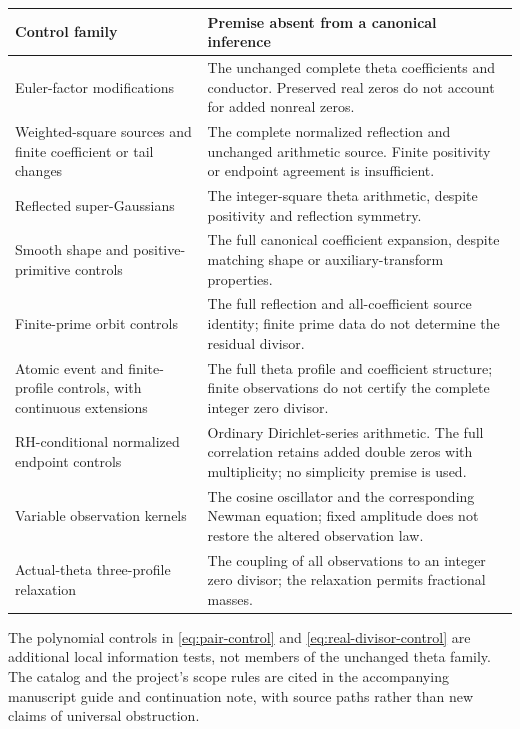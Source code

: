 \begin{center}\small
\begin{tabularx}{\textwidth}{@{}>{\raggedright\arraybackslash}p{}Y@{}}
\toprule
Control family & Premise absent from a canonical inference\\
\midrule
Euler-factor modifications &
The unchanged complete theta coefficients and conductor. Preserved
real zeros do not account for added nonreal zeros.\\
Weighted-square sources and finite coefficient or tail changes &
The complete normalized reflection and unchanged arithmetic
source. Finite positivity or endpoint agreement is insufficient.\\
Reflected super-Gaussians &
The integer-square theta arithmetic, despite positivity and
reflection symmetry.\\
Smooth shape and positive-primitive controls &
The full canonical coefficient expansion, despite matching
shape or auxiliary-transform properties.\\
Finite-prime orbit controls &
The full reflection and all-coefficient source identity;
finite prime data do not determine the residual divisor.\\
Atomic event and finite-profile controls, with continuous extensions &
The full theta profile and coefficient structure; finite
observations do not certify the complete integer zero divisor.\\
RH-conditional normalized endpoint controls &
Ordinary Dirichlet-series arithmetic. The full correlation retains
added double zeros with multiplicity; no simplicity premise is used.\\
Variable observation kernels &
The cosine oscillator and the corresponding Newman equation;
fixed amplitude does not restore the altered observation law.\\
Actual-theta three-profile relaxation &
The coupling of all observations to an integer zero divisor;
the relaxation permits fractional masses.\\
\bottomrule
\end{tabularx}
\end{center}

The polynomial controls in
\eqref{eq:pair-control} and \eqref{eq:real-divisor-control}
are additional local information tests, not members of the
unchanged theta family. The catalog and the project's scope
rules are cited in the accompanying manuscript guide and
continuation note, with source paths rather than new claims
of universal obstruction.

